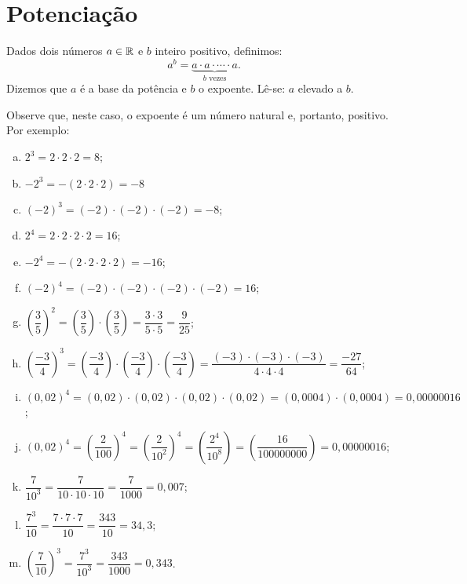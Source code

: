 \section{Potenciação}


\begin{obs}
  
  Dados dois números $a \in \mathbb{R}$ e $b$ inteiro positivo, definimos:
\begin{equation*}
a^b= \underbrace{a \cdot a \cdot \cdots \cdot a}_{b \text{ vezes}} .
\end{equation*}
  Dizemos que $a$ é a base da potência e $b$ o expoente. Lê-se: $a$ elevado a $b$.
\end{obs}


 \begin{exem}
 Observe que, neste caso, o expoente é um número natural e, portanto, positivo. Por exemplo:

 \begin{enumerate}[a)]
  \item $2^3= 2 \cdot 2 \cdot 2= 8$;
  \item $-2^3= -(2 \cdot 2 \cdot 2)= -8$
  \item $(-2)^3= (-2) \cdot (-2) \cdot (-2)= -8$;
  \item $2^4=2 \cdot 2 \cdot 2 \cdot  2= 16$;
  \item $-2^4= -(2 \cdot 2 \cdot 2 \cdot 2)= -16$;
  \item $(-2)^4= (-2) \cdot (-2) \cdot (-2) \cdot (-2)= 16$;
  \item $\left(\dfrac{3}{5}\right)^2= \left(\dfrac{3}{5}\right) \cdot \left(\dfrac{3}{5}\right)= \dfrac{3 \cdot 3}{5 \cdot 5}= \dfrac{9}{25}$;
  \item $\left(\dfrac{-3}{4}\right)^3= \left(\dfrac{-3}{4}\right) \cdot \left(\dfrac{-3}{4}\right) \cdot \left(\dfrac{-3}{4}\right)= \dfrac{(-3) \cdot (-3) \cdot (-3)}{4 \cdot 4 \cdot 4}= \dfrac{-27}{64}$;
  \item $(0,02)^4= (0,02) \cdot (0,02) \cdot (0,02) \cdot (0,02)= (0,0004) \cdot (0,0004)= 0,00000016$;
  \item $(0,02)^4= \left(\dfrac{2}{100}\right)^4= \left(\dfrac{2}{10^2}\right)^4= \left(\dfrac{2^4}{10^8}\right)= \left(\dfrac{16}{100000000}\right)= 0,00000016$;
  \item $\dfrac{7}{10^3}= \dfrac{7}{10 \cdot 10 \cdot 10}= \dfrac{7}{1000}= 0,007$;
  \item $\dfrac{7^3}{10}=  \dfrac{7 \cdot 7 \cdot 7}{10}= \dfrac{343}{10}=34,3$;
  \item $\left(\dfrac{7}{10}\right)^3= \dfrac{7^3}{10^3}= \dfrac{343}{1000}= 0,343$.
  \end{enumerate}

 \end{exem}


